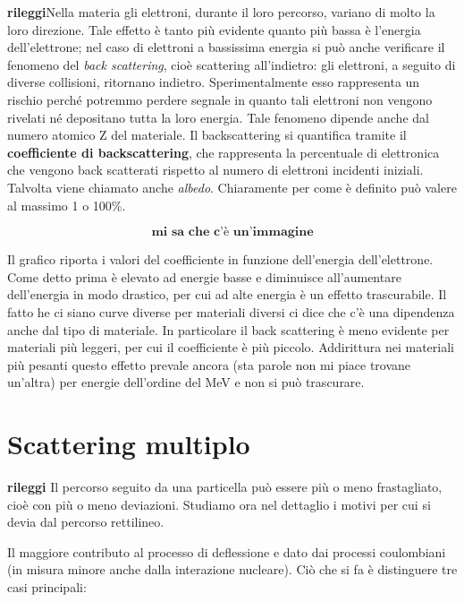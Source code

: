 \textbf{rileggi}Nella materia gli elettroni, durante il loro percorso, variano di molto la loro direzione. Tale effetto è tanto più evidente quanto più bassa è l'energia dell'elettrone; nel caso di elettroni a bassissima energia si può anche verificare il fenomeno del \textit{back scattering}, cioè scattering all'indietro: gli elettroni, a seguito di diverse collisioni, ritornano indietro. Sperimentalmente esso rappresenta un rischio perché potremmo perdere segnale in quanto tali elettroni non vengono rivelati né depositano tutta la loro energia. Tale fenomeno dipende anche dal numero atomico Z del materiale. Il backscattering si quantifica tramite il \textbf{coefficiente di backscattering}, che rappresenta la percentuale di elettronica che vengono back scatterati rispetto al numero di elettroni incidenti iniziali. Talvolta viene chiamato anche \textit{albedo}. Chiaramente per come è definito può valere al massimo 1 o 100\%.

$$\textbf{mi sa che c'è un'immagine}$$

Il grafico riporta i valori del coefficiente in funzione dell'energia dell'elettrone. Come detto prima è elevato ad energie basse e diminuisce all'aumentare dell'energia in modo drastico, per cui ad alte energia è un effetto trascurabile. Il fatto he ci siano curve diverse per materiali diversi ci dice che c'è una dipendenza anche dal tipo di materiale. In particolare il back scattering è meno evidente per materiali più leggeri, per cui il coefficiente è più piccolo. Addirittura nei materiali più pesanti questo effetto prevale ancora (sta parole non mi piace trovane un'altra) per energie dell'ordine del MeV e non si può trascurare.

\section{Scattering multiplo}

\textbf{rileggi}
Il percorso seguito da una particella può essere più o meno frastagliato, cioè con più o meno deviazioni. Studiamo ora nel dettaglio i motivi per cui si devia dal percorso rettilineo.

Il maggiore contributo al processo di deflessione e dato dai processi coulombiani (in misura minore anche dalla interazione nucleare). Ciò che si fa è distinguere tre casi principali:

